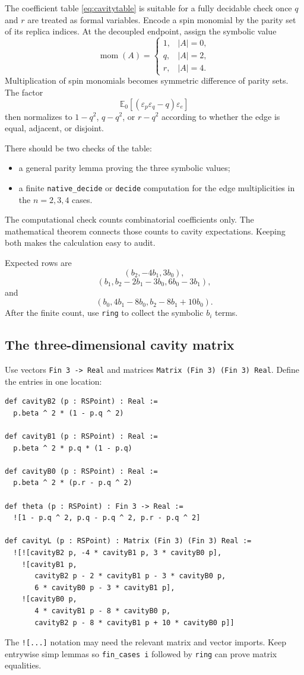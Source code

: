 \documentclass[11pt]{article}
\numberwithin{equation}{section}
\newcommand{\E}{\mathbb{E}}
\newcommand{\1}{\mathbf 1}
\begin{document}
The coefficient table \eqref{eq:cavitytable} is suitable for a fully
decidable check once $q$ and $r$ are treated as formal variables.  Encode a
spin monomial by the parity set of its replica indices.  At the decoupled
endpoint, assign the symbolic value
\[
 \operatorname{mom}(A)=
 \begin{cases}
 1,&|A|=0,\\
 q,&|A|=2,\\
 r,&|A|=4.
 \end{cases}
\]
Multiplication of spin monomials becomes symmetric difference of parity sets.
The factor
\[
 \E_0[(\varepsilon_p\varepsilon_q-q)\varepsilon_e]
\]
then normalizes to $1-q^2$, $q-q^2$, or $r-q^2$ according to whether the
edge is equal, adjacent, or disjoint.

There should be two checks of the table:
\begin{itemize}[leftmargin=2em]
\item a general parity lemma proving the three symbolic values;
\item a finite \texttt{native\_decide} or \texttt{decide} computation for
      the edge multiplicities in the $n=2,3,4$ cases.
\end{itemize}
The computational check counts combinatorial coefficients only.  The
mathematical theorem connects those counts to cavity expectations.  Keeping
both makes the calculation easy to audit.

Expected rows are
\[
 (b_2,-4b_1,3b_0),
\]
\[
 (b_1,b_2-2b_1-3b_0,6b_0-3b_1),
\]
and
\[
 (b_0,4b_1-8b_0,b_2-8b_1+10b_0).
\]
After the finite count, use \texttt{ring} to collect the symbolic $b_i$
terms.

\subsection{The three-dimensional cavity matrix}

Use vectors \texttt{Fin 3 -> Real} and matrices
\texttt{Matrix (Fin 3) (Fin 3) Real}.  Define the entries in one location:
\begin{lstlisting}
def cavityB2 (p : RSPoint) : Real :=
  p.beta ^ 2 * (1 - p.q ^ 2)

def cavityB1 (p : RSPoint) : Real :=
  p.beta ^ 2 * p.q * (1 - p.q)

def cavityB0 (p : RSPoint) : Real :=
  p.beta ^ 2 * (p.r - p.q ^ 2)

def theta (p : RSPoint) : Fin 3 -> Real :=
  ![1 - p.q ^ 2, p.q - p.q ^ 2, p.r - p.q ^ 2]

def cavityL (p : RSPoint) : Matrix (Fin 3) (Fin 3) Real :=
  ![![cavityB2 p, -4 * cavityB1 p, 3 * cavityB0 p],
    ![cavityB1 p,
       cavityB2 p - 2 * cavityB1 p - 3 * cavityB0 p,
       6 * cavityB0 p - 3 * cavityB1 p],
    ![cavityB0 p,
       4 * cavityB1 p - 8 * cavityB0 p,
       cavityB2 p - 8 * cavityB1 p + 10 * cavityB0 p]]
\end{lstlisting}
The \texttt{![...]} notation may need the relevant matrix and vector
imports.  Keep entrywise simp lemmas so \texttt{fin\_cases i} followed by
\texttt{ring} can prove matrix equalities.
\end{document}
